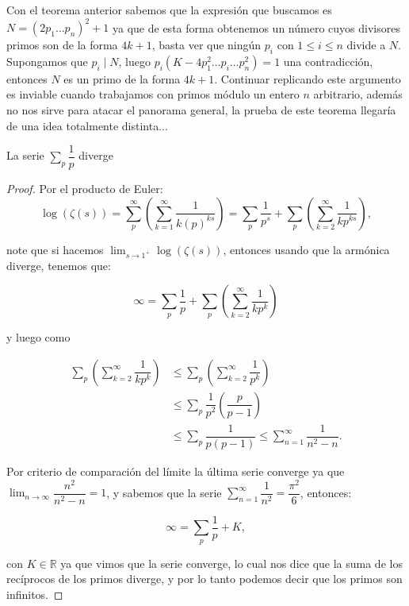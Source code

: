 Con el teorema anterior sabemos que la expresión que buscamos es $N=(2p_1\ldots p_n)^2+1$ ya que de esta forma obtenemos un número cuyos divisores primos son de la forma $4k+1$, basta ver que ningún $p_i$ con $1\leq i\leq n$ divide a $N$.\\

Supongamos que $p_i\mid N$, luego $p_i(K-4p_1^2\ldots p_i\ldots p_n^2)=1$ una contradicción, entonces $N$ es un primo de la forma $4k+1$. Continuar replicando este argumento es inviable cuando trabajamos con primos módulo un entero $n$ arbitrario, además no nos sirve para atacar el panorama general, la prueba de este teorema llegaría de una idea totalmente distinta...


\begin{theorem}[Euler]
La serie $\displaystyle\sum_p \dfrac{1}{p}$ diverge
\end{theorem}

\begin{proof}
Por el producto de Euler:
    $$
\log (\zeta(s))=\sum_p^{\infty}\left(\displaystyle\sum_{k=1}^{\infty} \dfrac{1}{k(p)^{k s}}\right)=\sum_p
\dfrac{1}{p^s}+\sum_{p}\left(\sum_{k=2}^{\infty}\dfrac{1}{kp^{ks}}\right),$$

note que si hacemos $\lim_{s\to 1^{+}} \log(\zeta(s))$, entonces usando que la armónica diverge, tenemos que:

$$
\infty=\sum_p
\dfrac{1}{p}+\sum_{p}\left(\sum_{k=2}^{\infty}\dfrac{1}{kp^{k}}\right)$$

y luego como

\begin{align*}
    \sum_{p}\left(\sum_{k=2}^{\infty}\dfrac{1}{kp^{k}}\right)&\leq \sum_{p}\left(\sum_{k=2}^{\infty}\dfrac{1}{p^{k}}\right)\\
    &\leq\sum_{p}\dfrac{1}{p^2}\left(\dfrac{p}{p-1}\right)\\
    &\leq \sum_{p}\dfrac{1}{p(p-1)}\leq \sum_{n=1}^{\infty}\dfrac{1}{n^2-n}.
\end{align*}

Por criterio de comparación del límite la última serie converge ya que $\lim_{n\to \infty}\dfrac{n^2}{n^2-n}=1$, y sabemos que la serie $\displaystyle\sum_{n=1}^{\infty}\dfrac{1}{n^2}=\dfrac{\pi^2}{6}$, entonces:

$$
\infty=\sum_p
\dfrac{1}{p}+ K,$$

con $K \in \mathbb{R}$ ya que vimos que la serie converge, lo cual nos dice que la suma de los recíprocos de los primos diverge, y por lo tanto podemos decir que los primos son infinitos. 
\end{proof}

